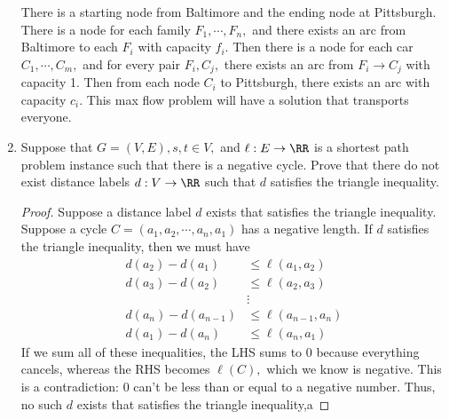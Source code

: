 \documentclass{article}
\begin{document}
\begin{enumerate}
\begin{soln}
			There is a starting node from Baltimore and the ending node at Pittsburgh. There is a node for each family $F_1, \cdots, F_n,$ and there exists an arc from Baltimore to each $F_i$ with capacity $f_i.$ Then there is a node for each car $C_1, \cdots, C_m,$ and for every pair $F_i, C_j,$ there exists an arc from $F_i\to C_j$ with capacity 1. Then from each node $C_i$ to Pittsburgh, there exists an arc with capacity $c_i.$ This max flow problem will have a solution that transports everyone.
		\end{soln}

		\newpage
	\item Suppose that $G=(V, E), s, t\in V,$ and $\ell:E\to \RR$ is a shortest path problem instance such that there is a negative cycle. Prove that there do not exist distance labels $d:V\to\RR$ such that $d$ satisfies the triangle inequality.
		\begin{proof}
			Suppose a distance label $d$ exists that satisfies the triangle inequality. Suppose a cycle $C=(a_1, a_2, \cdots, a_n, a_1)$ has a negative length. If $d$ satisfies the triangle inequality, then we must have
			\begin{align*}
				d(a_2)-d(a_1)&\le \ell(a_1, a_2) \\
				d(a_3)-d(a_2) &\le \ell(a_2, a_3) \\
				&\vdots \\
				d(a_n)-d(a_{n-1})&\le \ell(a_{n-1}, a_n) \\
				d(a_1)-d(a_n) &\le \ell(a_n, a_1)
			\end{align*}
			If we sum all of these inequalities, the LHS sums to 0 because everything cancels, whereas the RHS becomes $\ell(C),$ which we know is negative. This is a contradiction: 0 can't be less than or equal to a negative number. Thus, no such $d$ exists that satisfies the triangle inequality,a
		\end{proof}

\end{enumerate}
\end{document}

